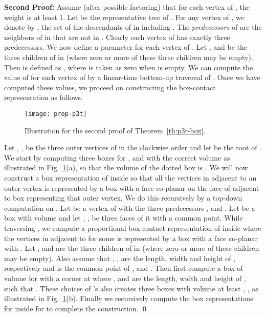 \documentclass{llncs}
\begin{document}
\noindent
\textbf{Second Proof:}
 Assume (after possible factoring) that for each vertex  of , the weight  is at least
 1. 
Let  be the representative tree of . For
 any vertex  of , we denote by , the set of the descendants of  in 
 including . The \textit{predecessors} of  are the neighbors of  in  that are not
 in . Clearly each vertex of  has exactly three predecessors.
We now define a parameter 
 for each vertex  of . Let ,  and  be the three children of  in
  (where zero or more of these three children may be empty). Then  is defined as
 , where  is taken as zero when  is empty. We
 can compute the value of  for each vertex  of  by a linear-time bottom-up
 traversal of . Once we have computed these values, we proceed on constructing the
 box-contact representation as follows.


\begin{figure}[htbp]
\centering
\texttt{[image: prop-p3t]}
\caption{Illustration for the second proof of Theorem~\ref{th:p3t-box}.}
\label{fig:prop-p3t}
\end{figure}


Let , ,  be the three outer vertices of  in the clockwise order and let  be the
 root of . We start by computing three boxes for ,  and  with the correct volume
 as illustrated in Fig.~\ref{fig:prop-p3t}(a), so that the volume of the dotted box  is .
 We will now construct a box representation of  inside  so that all the vertices in 
 adjacent to an outer vertex is represented by a box with a face co-planar on the face of 
 adjacent to box representing that outer vertex. We do this recursively by a top-down
 computation on . Let  be a vertex of  with the three predecessors , 
 and . Let  be a box with volume  and let , ,  be three faces
 of it with a common point. While traversing , we compute a proportional box-contact
 representation of  inside  where the vertices in  adjacent to  for some
  is represented by a box with a face co-planar with . Let ,  and
  are the three children of  in  (where zero or more of these children may be
 empty). Also assume that , ,  are the length, width and height of ,
 respectively and  is the common point of ,  and . Then first compute a
 box  of volume  for  with a corner at  where ,  and 
 are the length, width and height of , such that
 .
 These choices of 's also creates three boxes  with volume at least ,
 , as illustrated in Fig.~\ref{fig:prop-p3t}(b). Finally we recursively compute
 the box representations for  inside  for  to complete
 the construction. \qed
\end{document}
